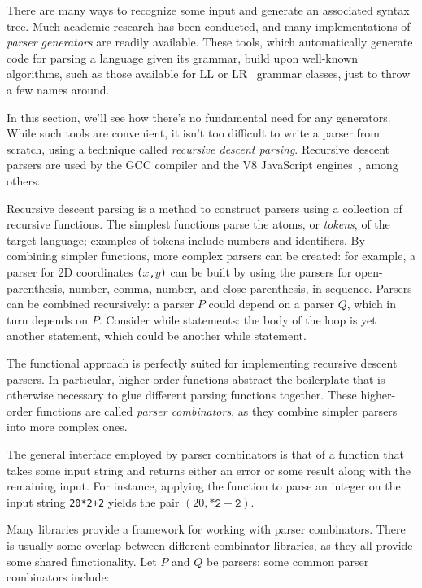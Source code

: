 \documentclass[UdineBachThesis,american,11pt]{PhdThesis}
\begin{document}
  There are many ways to recognize some input and generate an associated syntax
  tree. Much academic research has been conducted, and many implementations of
  \emph{parser generators} are readily available. These tools, which
  automatically generate code for parsing a language given its grammar, build
  upon well-known algorithms, such as those available for LL or LR~\cite{lr}
  grammar classes, just to throw a few names around.

  In this section, we'll see how there's no fundamental need for any generators.
  While such tools are convenient, it isn't too difficult to write a parser from
  scratch, using a technique called \emph{recursive descent parsing}. Recursive
  descent parsers are used by the GCC compiler and the V8 JavaScript
  engines~\cite{recursive-descent-parsing}, among others.

  Recursive descent parsing is a method to construct parsers using a collection
  of recursive functions. The simplest functions parse the atoms, or
  \emph{tokens}, of the target language; examples of tokens include numbers and
  identifiers. By combining simpler functions, more complex parsers can be
  created: for example, a parser for 2D coordinates \mbox{\texttt{($x$,$y$)}}
  can be built by using the parsers for open-parenthesis, number, comma, number,
  and close-parenthesis, in sequence. Parsers can be combined recursively: a
  parser $P$ could depend on a parser $Q$, which in turn depends on $P$\@.
  Consider while statements: the body of the loop is yet another statement,
  which could be another while statement.

  The functional approach is perfectly suited for implementing recursive descent
  parsers. In particular, higher-order functions abstract the boilerplate that
  is otherwise necessary to glue different parsing functions together. These
  higher-order functions are called \emph{parser combinators}, as they combine
  simpler parsers into more complex ones.

  The general interface employed by parser combinators is that of a function
  that takes some input string and returns either an error or some result along
  with the remaining input. For instance, applying the function to parse an
  integer on the input string \mbox{\texttt{20*2+2}} yields the pair
  \mbox{$\left(20, \mathtt{*2+2}\right)$}.

  Many libraries provide a framework for working with parser combinators. There
  is usually some overlap between different combinator libraries, as they all
  provide some shared functionality. Let $P$ and $Q$ be parsers; some common
  parser combinators include:
\end{document}
